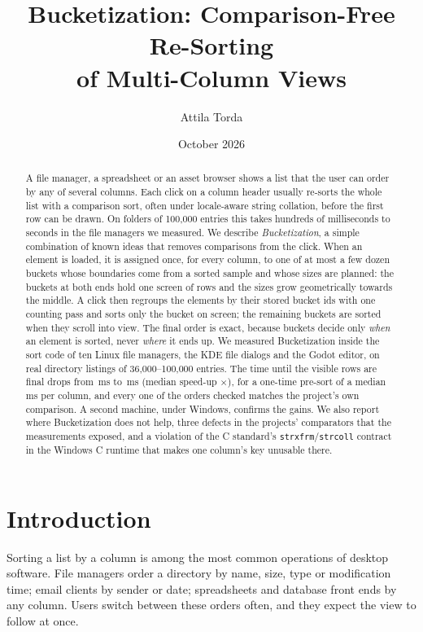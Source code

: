 \documentclass[11pt]{article}
\title{Bucketization: Comparison-Free Re-Sorting\\of Multi-Column Views}
\author{Attila Torda}
\date{October 2026}
\theoremstyle{definition}
\begin{document}
\maketitle

\begin{abstract}
A file manager, a spreadsheet or an asset browser shows a list that the user
can order by any of several columns. Each click on a column header usually
re-sorts the whole list with a comparison sort, often under locale-aware
string collation, before the first row can be drawn. On folders of
100{,}000 entries this takes hundreds of milliseconds to seconds in the file
managers we measured. We describe \emph{Bucketization}, a simple combination
of known ideas that removes comparisons from the click. When an element is
loaded, it is assigned once, for every column, to one of at most a few dozen
buckets whose boundaries come from a sorted sample and whose sizes are
planned: the buckets at both ends hold one screen of rows and the sizes grow
geometrically towards the middle. A click then regroups the elements by their
stored bucket ids with one counting pass and sorts only the bucket on screen;
the remaining buckets are sorted when they scroll into view. The final order
is exact, because buckets decide only \emph{when} an element is sorted, never
\emph{where} it ends up. We measured Bucketization inside the sort code of
ten Linux file managers, the KDE file dialogs and the Godot editor, on real directory listings of
36{,}000--100{,}000 entries. The time until the visible rows are final drops
from \,ms to \,ms (median
speed-up $\times$), for a one-time pre-sort of
a median \,ms per column, and every one of the
 orders checked matches the project's own comparison.
A second machine, under Windows, confirms the gains. We also report where
Bucketization does not help, three defects in the projects' comparators that
the measurements exposed, and a violation of the C standard's
\texttt{strxfrm}/\texttt{strcoll} contract in the Windows C runtime that makes
one column's key unusable there.
\end{abstract}

\section{Introduction}

Sorting a list by a column is among the most common operations of desktop
software. File managers order a directory by name, size, type or modification
time; email clients by sender or date; spreadsheets and database front ends by
any column. Users switch between these orders often, and they expect the view
to follow at once.
\end{document}
